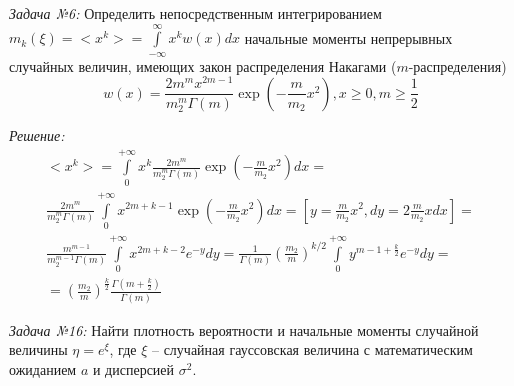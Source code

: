 \documentclass[14pt, final, titlepage, pscyr]{hedwork}
\begin{document}
\maketitle
\emph{Задача №6:} Определить непосредственным интегрированием \\
\( 
    m_k(\xi) = <x^k> = \int\limits_{-\infty}^{\infty} x^k w(x) dx
\) начальные моменты непрерывных случайных величин, имеющих закон распределения
Накагами (\( m \)-распределения)
\[
    w(x) = \frac{2m^m x^{2m-1}}{m_2^m \Gamma(m)}
        \exp\left( -\frac{m}{m_2}x^2 \right), x \geq 0, m \geq \frac{1}{2}
\]

\emph{Решение:}
\begin{gather}
    <x^k> = \int\limits_{0}^{+\infty} x^k 
        \frac{2m^m}{m_2^m \Gamma(m)}
        \exp\left( -\frac{m}{m_2}x^2 \right) dx = \nonumber \\
        \frac{2m^m}{m_2^m \Gamma(m)} \int\limits_{0}^{+\infty} 
        x^{2m+k-1} \exp\left( -\frac{m}{m_2}x^2 \right) dx =
        \left[ y = \frac{m}{m_2}x^2, dy = 2\frac{m}{m_2} x dx \right] = 
        \nonumber \\ \frac{m^{m-1}}{m_2^{m-1} \Gamma(m)} 
        \int\limits_{0}^{+\infty} x^{2m+k-2} e^{-y} dy = 
        \frac{1}{\Gamma(m)} \left( \frac{m_2}{m} \right)^{k/2} 
        \int\limits_{0}^{+\infty} y^{m-1+\frac{k}{2}} e^{-y} dy = \nonumber \\
        = \left( \frac{m_2}{m} \right)^{\frac{k}{2}} 
        \frac{\Gamma(m+\frac{k}{2})}{\Gamma(m)} \nonumber
\end{gather}

\newpage

\emph{Задача №16:} Найти плотность вероятности и начальные моменты случайной 
величины \( \eta = e^\xi \), где \( \xi \) -- случайная гауссовская величина 
с математическим ожиданием \( a \) и дисперсией \( \sigma^2 \).
\end{document}
